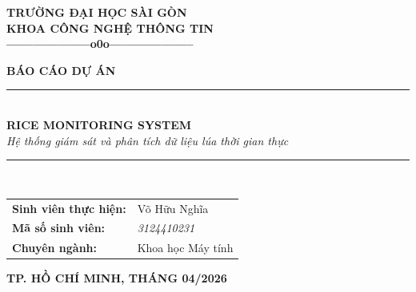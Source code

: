 \documentclass[12pt,a4paper]{report}
\begin{document}
\begin{titlepage}

\begin{center}
    {\fontsize{14pt}{16.8pt}\selectfont \textbf{TRƯỜNG ĐẠI HỌC SÀI GÒN}} \\
    {\fontsize{14pt}{16.8pt}\selectfont \textbf{KHOA CÔNG NGHỆ THÔNG TIN}} \\
    \vspace{0.5cm}
    \textbf{--------------------o0o--------------------} \\
    \vspace{1.5cm}

    \begin{figure}[H]
        \centering
    \end{figure}
    \vspace{1cm}

    {\fontsize{18pt}{21.6pt}\selectfont \textbf{BÁO CÁO DỰ ÁN}} \\
    \vspace{1cm}

    {\color{blue!80!black} \rule{\linewidth}{1.5pt}} \\[0.5cm]
    {\fontsize{24pt}{28.8pt}\selectfont \textbf{RICE MONITORING SYSTEM}} \\[0.2cm]
    {\fontsize{16pt}{19.2pt}\selectfont \textit{Hệ thống giám sát và phân tích dữ liệu lúa thời gian thực}} \\
    {\color{blue!80!black} \rule{\linewidth}{1.5pt}} \\
    \vspace{2cm}

    \begin{flushright}
        \begin{tabular}{ll}
            \fontsize{13pt}{15.6pt}\selectfont \textbf{Sinh viên thực hiện:} & \fontsize{13pt}{15.6pt}\selectfont Võ Hữu Nghĩa \\
            \fontsize{13pt}{15.6pt}\selectfont \textbf{Mã số sinh viên:} & \fontsize{13pt}{15.6pt}\selectfont \textit{3124410231} \\
            \fontsize{13pt}{15.6pt}\selectfont \textbf{Chuyên ngành:} & \fontsize{13pt}{15.6pt}\selectfont Khoa học Máy tính \\
        \end{tabular}
    \end{flushright}

    \vfill 

    {\fontsize{13pt}{15.6pt}\selectfont \textbf{TP. HỒ CHÍ MINH, THÁNG 04/2026}}
\end{center}
\end{titlepage}
\end{document}
